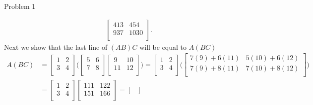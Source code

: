 \begin{problem}{Problem 1}
\begin{Highlight}[Solution]
\begin{align*}
\begin{bmatrix}
                413 & 454 \\
                937 & 1030 \\
            \end{bmatrix}.
        \end{align*}
        Next we show that the last line of $(AB)C$ will be equal to $A(BC)$
        \begin{align*}
            A(BC) & = 
            \begin{bmatrix}
                1 & 2 \\
                3 & 4 \\
            \end{bmatrix}
            \Bigg( 
                \begin{bmatrix}
                    5 & 6 \\
                    7 & 8 \\
                \end{bmatrix}
                \begin{bmatrix}
                    9 & 10 \\
                    11 & 12 \\
                \end{bmatrix}
            \Bigg) 
            = 
            \begin{bmatrix}
                1 & 2 \\
                3 & 4 \\
            \end{bmatrix}
            \Bigg(
                \begin{bmatrix}
                    7(9) + 6(11) & 5(10) + 6(12) \\
                    7(9) + 8(11) & 7(10) + 8(12) \\
                \end{bmatrix}
            \Bigg) \\
            & = 
            \begin{bmatrix}
                1 & 2 \\
                3 & 4 \\
            \end{bmatrix}
            \begin{bmatrix}
                111 & 122 \\
                151 & 166 \\
            \end{bmatrix}
            = 
            \begin{bmatrix}

\end{bmatrix}
\end{align*}
\end{Highlight}
\end{problem}
